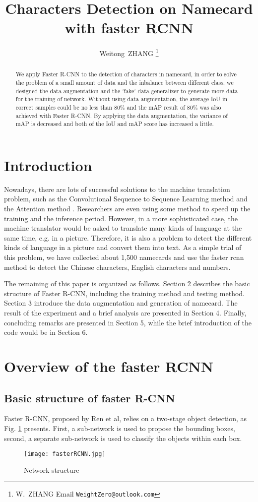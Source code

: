 \documentclass{IEEEtran}
\title{Characters Detection on Namecard with faster RCNN}
\author{
    Weitong~ZHANG
    \thanks{W.~ZHANG Email \texttt{WeightZero@outlook.com}}
}
\begin{document}
\maketitle
\begin{abstract}
    We apply Faster R-CNN to the detection of characters in namecard, in order to 
    solve the problem of a small amount of data and the inbalance between different class,
    we designed the data augmentation and the 'fake' data generalizer to generate more data
    for the training of network. Without using data augmentation, 
    the average IoU in correct samples could be no less than 80\% and the mAP result of 80\% 
    was also achieved with Faster R-CNN. By applying the data augmentation, the variance of mAP
    is decreased and both of the IoU and mAP score has increased a little.
\end{abstract}
\section{Introduction}
Nowadays, there are lots of successful solutions to the machine translation problem, such as the
Convolutional Sequence to Sequence Learning\cite{GehringAGYD17} method and the Attention method \cite{VaswaniSPUJGKP17}.
Researchers are even using some method to speed up the training\cite{DBLP:journals/corr/abs-1709-02755}
and the inference period\cite{DBLP:journals/corr/GuCL17}. However, in a more sophisticated case, the machine translator
would be asked to translate many kinds of language at the same time, e.g. in a picture. Therefore, it is also a problem
to detect the different kinds of language in a picture and convert them into text. As a simple trial of this problem,
we have collected about 1,500 namecards and use the faster rcnn method to detect the Chinese characters, English characters
and numbers.

The remaining of this paper is organized as follows. Section 2 describes the basic structure of Faster R-CNN, including the 
training method and testing method. Section 3 introduce the data augmentation and generation of namecard. 
The result of the experiment and a brief analysis are presented in Section 4. Finally, concluding remarks are presented in Section 5, while the brief introduction of the code would be in Section 6.

\section{Overview of the faster RCNN}
\subsection{Basic structure of faster R-CNN}
Faster R-CNN\cite{renNIPS15fasterrcnn}, proposed by Ren et al, relies on a two-stage object detection, as Fig. \ref{FasterRCNN} presents. First, a sub-network is used to propose the bounding boxes, second, a separate sub-network is used to classify the objects within each box.
\begin{figure}[h]
    \centering
    \texttt{[image: fasterRCNN.jpg]}
    \caption{Network structure}
    \label{FasterRCNN}
\end{figure}
\end{document}
